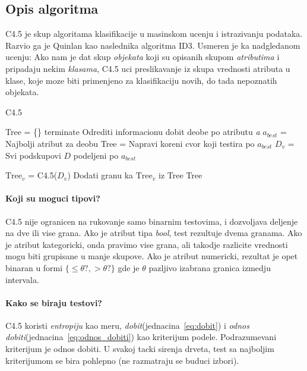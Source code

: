 \documentclass[a4paper]{article}
\begin{document}
\subsection{Opis algoritma}
C4.5 je skup algoritama klasifikacije u masinskom ucenju i istrazivanju podataka. Razvio ga je
Quinlan kao naslednika algoritma ID3.  Usmeren je ka nadgledanom ucenju: Ako nam je dat skup
\emph{objekata} koji su opisanih skupom \emph{atributima} i pripadaju nekim \emph{klasama}, C4.5 uci
preslikavanje iz skupa vrednosti atributa u klase, koje moze biti primenjeno za klasifikaciju novih,
do tada nepoznatih objekata.

\renewcommand{\algorithmicrequire}{\textbf{Input:}}

\begin{algorithm}
\caption{C4.5}\label{code:c4.5}
\begin{algorithmic}[1]
    \State Tree = \{\}
    \State terminate
    \EndIf
        \State Odrediti informacionu dobit deobe po atributu \emph{a}
    \EndFor
    \State \(a_{best}\) = Najbolji atribut za deobu
    \State Tree = Napravi koreni cvor koji testira po \(a_{best}\)
    \State \(D_v\) = Svi podskupovi \(D\) podeljeni po \(a_{best}\)

        \State \(\text{Tree}_v\) = C4.5(\(D_v\))
        \State Dodati granu ka \(\text{Tree}_v\) iz Tree
    \EndFor
    \State \Return Tree
\EndProcedure
\end{algorithmic}
\end{algorithm}

\paragraph{Koji su moguci tipovi?} C4.5 nije ogranicen na rukovanje samo binarnim testovima, i
dozvoljava deljenje na dve ili vise grana. Ako je atribut tipa \emph{bool}, test rezultuje dvema
granama. Ako je atribut kategoricki, onda pravimo vise grana, ali takodje razlicite vrednosti mogu
biti grupisane u manje skupove. Ako je atribut numericki, rezultat je opet binaran u formi \(\{\leq
\theta?, > \theta?\}\) gde je \(\theta\) pazljivo izabrana granica izmedju intervala.

\paragraph{Kako se biraju testovi?} C4.5 koristi \emph{entropiju} kao meru,
\emph{dobit}(jednacina~\ref{eq:dobit}) i \emph{odnos dobiti}(jednacina~\ref{eq:odnos_dobiti}) kao
kriterijum podele. Podrazumevani kriterijum je odnos dobiti. U svakoj tacki sirenja drveta, test sa
najboljim kriterijumom se bira pohlepno (ne razmatraju se buduci izbori).
\end{document}
